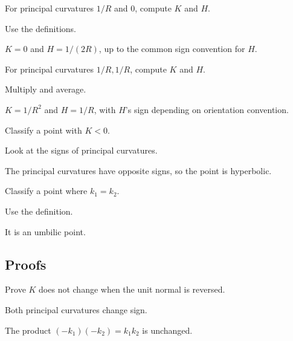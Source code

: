 \begin{exercise}\label{exr:vii17-ped-02}
For principal curvatures \(1/R\) and \(0\), compute \(K\) and \(H\).
\end{exercise}
\begin{hint}
Use the definitions.
\end{hint}
\begin{solution}
\(K=0\) and \(H=1/(2R)\), up to the common sign convention for \(H\).
\end{solution}

\begin{exercise}\label{exr:vii17-ped-03}
For principal curvatures \(1/R,1/R\), compute \(K\) and \(H\).
\end{exercise}
\begin{hint}
Multiply and average.
\end{hint}
\begin{solution}
\(K=1/R^2\) and \(H=1/R\), with \(H\)'s sign depending on orientation convention.
\end{solution}

\begin{exercise}\label{exr:vii17-ped-04}
Classify a point with \(K<0\).
\end{exercise}
\begin{hint}
Look at the signs of principal curvatures.
\end{hint}
\begin{solution}
The principal curvatures have opposite signs, so the point is hyperbolic.
\end{solution}

\begin{exercise}\label{exr:vii17-ped-05}
Classify a point where \(k_1=k_2\).
\end{exercise}
\begin{hint}
Use the definition.
\end{hint}
\begin{solution}
It is an umbilic point.
\end{solution}

\subsection*{Proofs}

\begin{exercise}\label{exr:vii17-ped-06}
Prove \(K\) does not change when the unit normal is reversed.
\end{exercise}
\begin{hint}
Both principal curvatures change sign.
\end{hint}
\begin{solution}
The product \((-k_1)(-k_2)=k_1k_2\) is unchanged.
\end{solution}

